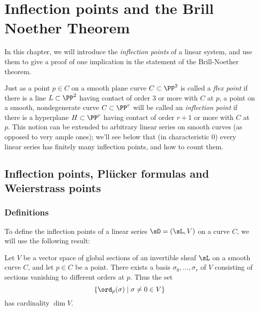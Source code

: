 

\chapter{Inflection points and the Brill Noether Theorem}
\label{InflectionsChapter}


In this chapter, we will introduce the \emph{inflection points} of a linear system, and use them to give a proof of one implication in the statement of the Brill-Noether theorem.

Just as a point $p \in C$ on a smooth plane curve $C \subset \PP^2$ is called a \emph{flex point} if there is a line $L \subset \PP^2$ having contact of order 3 or more with $C$ at $p$, a point on a smooth, nondegenerate curve $C \subset \PP^r$ will be called an \emph{inflection point} if there is a hyperplane $H \subset \PP^r$ having contact of order $r+1$ or more with $C$ at $p$. This notion can be extended to arbitrary linear series on smooth curves (as opposed to very ample ones); we'll see below that (in characteristic 0) every linear series has finitely many inflection points, and how to count them.


\section{Inflection points,  Pl\"ucker formulas and Weierstrass points}

\subsection{Definitions}
To define the inflection points of a linear series $\sD = (\sL, V)$ on a curve $C$, we will use the following result:

\begin{proposition}\label{vanishing sequence} Let $V$ be a vector space of global sections of an invertible sheaf $\sL$ on a smooth curve $C$, and let $p \in C$ be a point. There exists a basis $\sigma_0, \dots, \sigma_r$ of $V$ consisting of sections vanishing to different orders at $p$. Thus the set
$$
\{ \ord_p(\sigma) \mid \sigma \neq 0 \in V \}
$$
 has cardinality $\dim V$.
\end{proposition}


